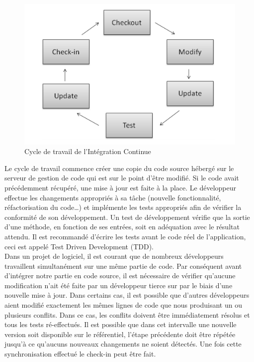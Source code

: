 \documentclass{report}
\begin{document}
      \begin{figure}
        \begin{center}
          \includegraphics[scale=0.5]{images/ICWorkflow.png}
        \end{center}
        \caption{Cycle de travail de l’Intégration Continue}
        \label{IC workflow}
      \end{figure}

      Le cycle de travail commence créer une copie du code source hébergé sur le serveur de gestion de code qui est sur le point d'être modifié. Si le code avait précédemment récupéré, une mise à jour est faite à la place. Le développeur effectue les changements appropriés à sa tâche (nouvelle fonctionnalité, réfactorisation du code…) et implémente les tests appropriés afin de vérifier la conformité de son développement. Un test de développement vérifie que la sortie d’une méthode, en fonction de ses entrées, soit en adéquation avec le résultat attendu. Il est recommandé d’écrire les tests avant le code réel de l’application, ceci est appelé Test Driven Development (TDD).\\

      Dans un projet de logiciel, il est courant que de nombreux développeurs travaillent simultanément sur une même partie de code.  Par conséquent avant d’intégrer notre partie en code source, il est nécessaire de vérifier qu’aucune modification n’ait été faite par un développeur tierce sur par le biais d’une nouvelle mise à jour. Dans certains cas, il est possible que d’autres développeurs aient modifié exactement les mêmes lignes de code que nous produisant un ou plusieurs conflits. Dans ce cas, les conflits doivent être immédiatement résolus et tous les tests ré-effectués. Il est possible que dans cet intervalle une nouvelle version soit disponible sur le référentiel,  l'étape précédente doit être répétée jusqu'à ce qu'aucuns nouveaux changements ne soient détectés. Une fois cette synchronisation effectué le check-in peut être fait.
\end{document}
